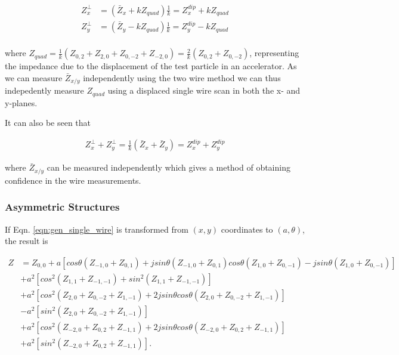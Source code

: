 \begin{align}
Z^{\perp}_{x} & = \left( \bar{Z}_{x} + kZ_{quad} \right)\frac{1}{k} =  Z^{dip}_{x} + kZ_{quad}\\
Z^{\perp}_{y} & = \left( \bar{Z}_{y} - kZ_{quad} \right)\frac{1}{k}= Z^{dip}_{y} - kZ_{quad} \\
\end{align}

where $Z_{quad}=\frac{1}{k}\left( Z_{0,2}+Z_{2,0}+Z_{0,-2}+Z_{-2,0}  \right) = \frac{2}{k}\left( Z_{0,2}+Z_{0,-2}  \right)$, representing the impedance due to the displacement of the test particle in an accelerator. As we can measure $\bar{Z}_{x/y}$ independently using the two wire method we can thus indepedently measure $Z_{quad}$ using a displaced single wire scan in both the x- and y-planes.

It can also be seen that

\begin{align}
Z^{\perp}_{x} + Z^{\perp}_{y} = \frac{1}{k}\left( \bar{Z}_{x} + \bar{Z}_{y} \right) = Z^{dip}_{x} + Z^{dip}_{y}
\end{align}

where $\bar{Z}_{x/y}$ can be measured independently which gives a method of obtaining confidence in the wire measurements.

\subsubsection{Asymmetric Structures}

If Eqn. \ref{eqn:gen_single_wire} is transformed from $\left( x,y \right)$ coordinates to $\left( a, \theta \right)$, the result is

\begin{align}
Z &=Z_{0,0} +a\left[ cos\theta \left( Z_{-1,0} + Z_{0,1} \right) +jsin\theta \left( Z_{-1,0} + Z_{0,1} \right)  cos\theta \left( Z_{1,0} + Z_{0,-1} \right) - jsin\theta \left( Z_{1,0} + Z_{0,-1} \right)\right] \nonumber \\
   &+a^{2}\left[ cos^{2} \left( Z_{1,1} + Z_{-1,-1} \right) + sin^{2} \left( Z_{1,1} + Z_{-1,-1} \right)\right] \nonumber \\
   &+a^{2}\left[ cos^{2} \left( Z_{2,0} + Z_{0,-2} +Z_{1,-1} \right) +2jsin\theta cos\theta\left( Z_{2,0} + Z_{0,-2} +Z_{1,-1} \right) \right] \nonumber \\
   & - a^{2}\left[sin^{2} \left( Z_{2,0} + Z_{0,-2} +Z_{1,-1} \right)\right] \nonumber  \\
   &+ a^{2}\left[ cos^{2} \left( Z_{-2,0} + Z_{0,2} +Z_{-1,1} \right) +2jsin\theta cos\theta\left( Z_{-2,0} + Z_{0,2} +Z_{-1,1}  \right) \right] \nonumber \\
   &+ a^{2}\left[sin^{2} \left( Z_{-2,0} + Z_{0,2} +Z_{-1,1}  \right) \right].
\end{align}

